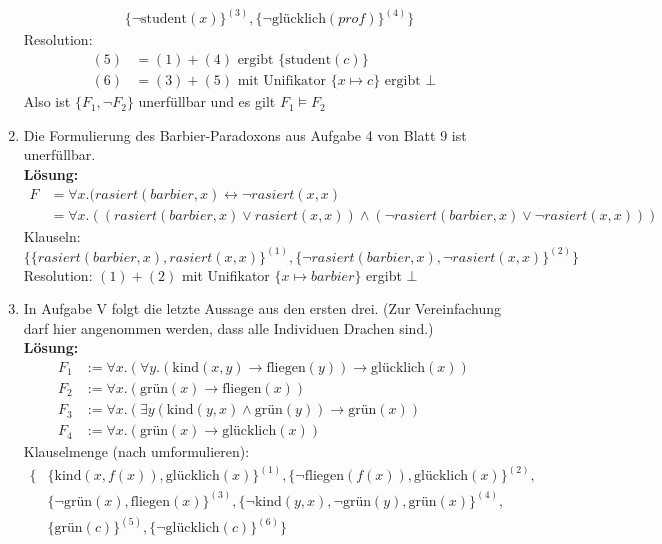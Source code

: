 \documentclass[a4paper,10pt]{article}
\newcommand{\f}[1]{\textbf{#1}}
\newcommand{\LOES}{\f{Lösung:~}}
\begin{document}
\begin{enumerate}
\begin{align*}
&\{\neg\text{student}(x)\}^{(3)}, \{\neg\text{glücklich}(prof)\}^{(4)}\}
\end{align*}
Resolution:
\begin{align*}
(5) &= (1) + (4) \text{ ergibt } \{\text{student}(c)\} \\
(6) &= (3) + (5) \text{ mit Unifikator } \{x \mapsto c\} \text{ ergibt } \bot
\end{align*}
Also ist $\{F_1, \neg F_2\}$ unerfüllbar und es gilt $F_1 \models F_2$
\item Die Formulierung des Barbier-Paradoxons aus Aufgabe 4 von Blatt 9 ist unerfüllbar. \\
\LOES 
\begin{align*}
F &= \forall x.(rasiert(barbier, x) \leftrightarrow \neg rasiert(x,x) \\
&= \forall x.((rasiert(barbier,x) \lor rasiert(x,x)) \land (\neg rasiert(barbier,x) \lor \neg rasiert(x,x)))
\end{align*}
Klauseln:
\begin{equation*}
\{\{rasiert(barbier,x),rasiert(x,x)\}^{(1)}, \{\neg rasiert(barbier, x), \neg rasiert(x,x)\}^{(2)}\}
\end{equation*}
Resolution: $(1) + (2)$ mit Unifikator $\{x \mapsto barbier\}$ ergibt $\bot$
\item In Aufgabe V folgt die letzte Aussage aus den ersten drei. (Zur Vereinfachung darf hier angenommen werden, dass alle Individuen Drachen sind.) \\
\LOES
\begin{align*}
F_1 &:= \forall x.(\forall y.(\text{kind}(x,y) \to \text{fliegen}(y)) \to \text{glücklich}(x)) \\
F_2 &:= \forall x.(\text{grün}(x) \to \text{fliegen}(x)) \\
F_3 &:= \forall x.(\exists y(\text{kind}(y, x) \land \text{grün}(y)) \to \text{grün}(x)) \\
F_4 &:= \forall x.(\text{grün}(x) \to \text{glücklich}(x))
\end{align*}
Klauselmenge (nach umformulieren):
\begin{align*}
\{&\{\text{kind}(x,f(x)), \text{glücklich}(x)\}^{(1)},\{\neg\text{fliegen}(f(x)), \text{glücklich}(x)\}^{(2)}, \\
&\{\neg\text{grün}(x), \text{fliegen}(x)\}^{(3)}, \{\neg\text{kind}(y,x), \neg\text{grün}(y), \text{grün}(x) \}^{(4)}, \\
&\{\text{grün}(c)\}^{(5)}, \{\neg\text{glücklich}(c)\}^{(6)}\}
\end{align*}

\end{enumerate}
\end{document}
